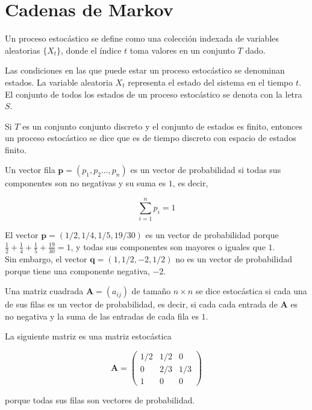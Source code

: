 \chapter{Cadenas de Markov} \label{ap:markov}

\begin{defi}
Un proceso estocástico se define como una colección indexada de variables aleatorias $\{X_t\}$, donde el índice $t$ toma valores en un conjunto $T$ dado.  
\end{defi}

\begin{defi}
Las condiciones en las que puede estar un proceso estocástico se denominan estados. La variable aleatoria $X_t$ representa el estado del sistema en el tiempo $t$. El conjunto de todos los estados de un proceso estocástico se denota con la letra $S$.
\end{defi}

\begin{defi}
Si $T$ es un conjunto conjunto discreto y el conjunto de estados es finito, entonces un proceso estocástico se dice que es de tiempo discreto con espacio de estados finito. 
\end{defi}

\begin{defi}
Un vector fila $\mathbf{p} = (p_1,p_2\dots,p_n)$ es un vector de probabilidad si todas sus componentes son no negativas y su suma es $1$, es decir,

\[ \sum\limits_{i=1}^{n} p_i = 1 \]
\end{defi}

\begin{ejemplo}
El vector $\mathbf{p} = (1/2, 1/4, 1/5, 19/30)$ es un vector de probabilidad porque $\frac{1}{2} + \frac{1}{4} + \frac{1}{5} + \frac{19}{30} = 1$, y todas sus componentes son mayores o iguales que $1$. \\
Sin embargo, el vector $\mathbf{q} = (1, 1/2, -2, 1/2)$ no es un vector de probabilidad porque tiene una componente negativa, $-2$.
\end{ejemplo}

\begin{defi}
Una matriz cuadrada $\mathbf{A} = (a_{ij})$ de tamaño $n \times n$ se dice estocástica si cada una de sus filas es un vector de probabilidad, es decir, si cada cada entrada de $\mathbf{A}$ es no negativa y la suma de las entradas de cada fila es $1$.
\end{defi}

\begin{ejemplo}
La siguiente matriz es una matriz estocástica 

\[\mathbf{A} = \left(\begin{array}{ccc}
1/2 & 1/2 & 0\\
0   & 2/3 & 1/3\\
1   &  0  & 0
\end{array}\right) \]

porque todas sus filas son vectores de probabilidad.
\end{ejemplo}

